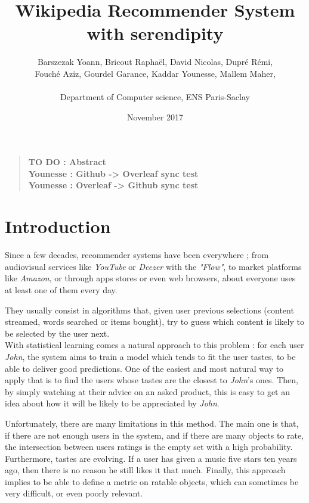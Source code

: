 \documentclass[11pt]{article}
\title{Wikipedia Recommender System with serendipity}
\author
    {
      Barszezak Yoann, Bricout Rapha\"el, David Nicolas, Dupr\'e R\'emi,\\
      Fouch\'e Aziz, Gourdel Garance, Kaddar Younesse, Mallem Maher,\\
      \\
      \normalsize{Department of Computer science, ENS Paris-Saclay}\\
    }
\date{November 2017}
\theoremstyle{plain}
\theoremstyle{definition}
\theoremstyle{remark}
\newenvironment{sciabstract}{
\begin{quote} \bf}
{\end{quote}}
\begin{document}
 


\baselineskip10pt


\maketitle 




\begin{sciabstract}
  TO DO : Abstract\\
  Younesse : Github -> Overleaf sync test\\
  Younesse : Overleaf -> Github sync test
\end{sciabstract}


\tableofcontents


\section*{Introduction}

Since a few decades, recommender systems have been everywhere ; from audiovisual services like \textit{YouTube} or \textit{Deezer} with the \textit{"Flow"}, to market platforms like \textit{Amazon}, or through apps stores or even web browsers, about everyone uses at least one of them every day. 

They usually consist in algorithms that, given user previous selections (content streamed, words searched or items bought), try to guess which content is likely to be selected by the user next. \\

With statistical learning comes a natural approach to this problem : for each user \textit{John}, the system aims to train a model which tends to fit the user tastes, to be able to deliver good predictions. One of the easiest and most natural way to apply that is to find the users whose tastes are the closest to \textit{John}'s ones. Then, by simply watching at their advice on an asked product, this is easy to get an idea about how it will be likely to be appreciated by \textit{John}.

Unfortunately, there are many limitations in this method. The main one is that, if there are not enough users in the system, and if there are many objects to rate, the intersection between users ratings is the empty set with a high probability. Furthermore, tastes are evolving. If a user has given a music five stars ten years ago, then there is no reason he still likes it that much. Finally, this approach implies to be able to define a metric on ratable objects, which can sometimes be very difficult, or even poorly relevant. \\
\end{document}
